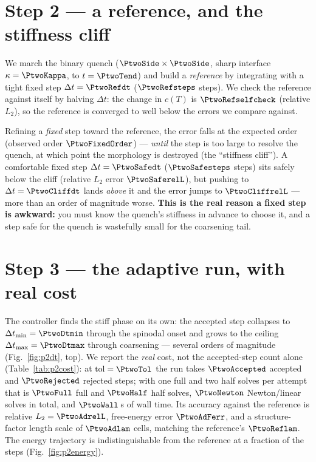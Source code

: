 \section{Step 2 --- a reference, and the stiffness cliff}

We march the binary quench ($\PtwoSide\times\PtwoSide$, sharp interface
$\kappa=\PtwoKappa$, to $t=\PtwoTend$) and build a \emph{reference} by
integrating with a tight fixed step $\Delta t=\PtwoRefdt$
($\PtwoRefsteps$ steps). We check the reference against itself by halving
$\Delta t$: the change in $c(T)$ is $\PtwoRefselfcheck$ (relative
$L_2$), so the reference is converged to well below the errors we compare
against.

Refining a \emph{fixed} step toward the reference, the error falls at the
expected order (observed order $\PtwoFixedOrder$) --- \emph{until} the
step is too large to resolve the quench, at which point the morphology is
destroyed (the ``stiffness cliff''). A comfortable fixed step
$\Delta t=\PtwoSafedt$ ($\PtwoSafesteps$ steps) sits safely below the
cliff (relative $L_2$ error $\PtwoSaferelL$), but pushing to
$\Delta t=\PtwoCliffdt$ lands \emph{above} it and the error jumps to
$\PtwoCliffrelL$ --- more than an order of magnitude worse.
\textbf{This is the real reason a fixed step is awkward:} you must know
the quench's stiffness in advance to choose it, and a step safe for the
quench is wastefully small for the coarsening tail.

\section{Step 3 --- the adaptive run, with real cost}

The controller finds the stiff phase on its own: the accepted step
collapses to $\Delta t_{\min}=\PtwoDtmin$ through the spinodal onset and
grows to the ceiling $\Delta t_{\max}=\PtwoDtmax$ through coarsening ---
several orders of magnitude (Fig.~\ref{fig:p2dt}, top). We report the
\emph{real} cost, not the accepted-step count alone
(Table~\ref{tab:p2cost}): at $\text{tol}=\PtwoTol$ the run takes
$\PtwoAccepted$ accepted and $\PtwoRejected$ rejected steps; with one
full and two half solves per attempt that is $\PtwoFull$ full and
$\PtwoHalf$ half solves, $\PtwoNewton$ Newton/linear solves in total, and
$\PtwoWall$\,s of wall time. Its accuracy against the reference is
relative $L_2 = \PtwoAdrelL$, free-energy error $\PtwoAdFerr$, and a
structure-factor length scale of $\PtwoAdlam$ cells, matching the
reference's $\PtwoReflam$. The energy trajectory is indistinguishable
from the reference at a fraction of the steps (Fig.~\ref{fig:p2energy}).

